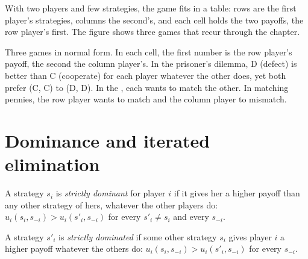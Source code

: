 With two players and few strategies, the game fits in a table: rows are the first player's strategies,
columns the second's, and each cell holds the two payoffs, the row player's first. The figure shows three
games that recur through the chapter.

\begin{omfigure}

{\small Three games in normal form. In each cell, the first number is the row player's payoff, the second
the column player's. In the prisoner's dilemma, D (defect) is better than C (cooperate) for each player
whatever the other does, yet both prefer (C, C) to (D, D). In the , each wants to match the
other. In matching pennies, the row player wants to match and the column player to mismatch.}
\end{omfigure}

\section{Dominance and iterated elimination}\label{sec:b2:static-games:dominance}

\begin{definition}\label{def:b2:static-games:dominant}
A strategy $s_i$ is \emph{strictly dominant} for player $i$ if it gives
her a higher payoff than any other strategy of hers, whatever the other players do: $u_i(s_i, s_{-i}) >
u_i(s'_i, s_{-i})$ for every $s'_i \ne s_i$ and every $s_{-i}$.
\end{definition}

\begin{definition}\label{def:b2:static-games:dominated}
A strategy $s'_i$ is \emph{strictly dominated} if some other strategy
$s_i$ gives player $i$ a higher payoff whatever the others do: $u_i(s_i, s_{-i}) > u_i(s'_i, s_{-i})$ for
every $s_{-i}$.
\end{definition}

